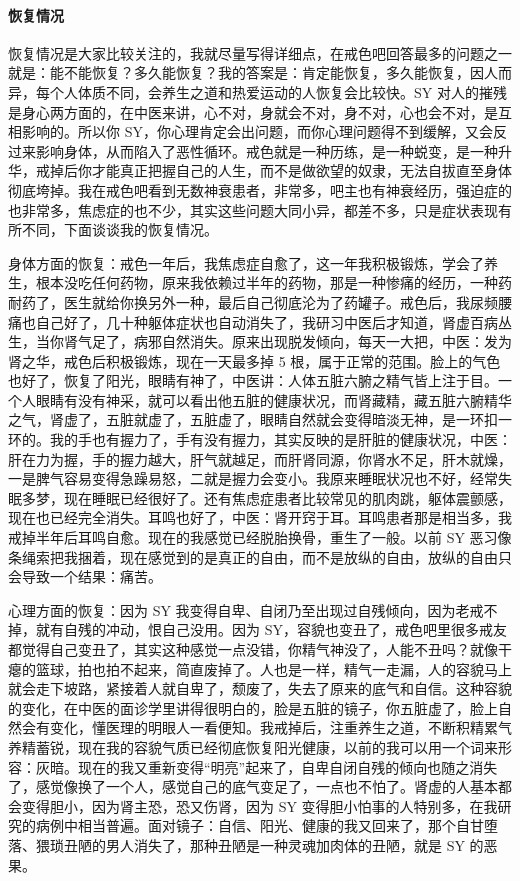 \documentclass[fontset=founder]{ctexart}
\begin{document}
\paragraph{恢复情况}

恢复情况是大家比较关注的，我就尽量写得详细点，在戒色吧回答最多的问题之一就是：能不能恢复？多久能恢复？我的答案是：肯定能恢复，多久能恢复，因人而异，每个人体质不同，会养生之道和热爱运动的人恢复会比较快。SY 对人的摧残是身心两方面的，在中医来讲，心不对，身就会不对，身不对，心也会不对，是互相影响的。所以你 SY，你心理肯定会出问题，而你心理问题得不到缓解，又会反过来影响身体，从而陷入了恶性循环。戒色就是一种历练，是一种蜕变，是一种升华，戒掉后你才能真正把握自己的人生，而不是做欲望的奴隶，无法自拔直至身体彻底垮掉。我在戒色吧看到无数神衰患者，非常多，吧主也有神衰经历，强迫症的也非常多，焦虑症的也不少，其实这些问题大同小异，都差不多，只是症状表现有所不同，下面谈谈我的恢复情况。

身体方面的恢复：戒色一年后，我焦虑症自愈了，这一年我积极锻炼，学会了养生，根本没吃任何药物，原来我依赖过半年的药物，那是一种惨痛的经历，一种药耐药了，医生就给你换另外一种，最后自己彻底沦为了药罐子。戒色后，我尿频腰痛也自己好了，几十种躯体症状也自动消失了，我研习中医后才知道，肾虚百病丛生，当你肾气足了，病邪自然消失。原来出现脱发倾向，每天一大把，中医：发为肾之华，戒色后积极锻炼，现在一天最多掉 5 根，属于正常的范围。脸上的气色也好了，恢复了阳光，眼睛有神了，中医讲：人体五脏六腑之精气皆上注于目。一个人眼睛有没有神采，就可以看出他五脏的健康状况，而肾藏精，藏五脏六腑精华之气，肾虚了，五脏就虚了，五脏虚了，眼睛自然就会变得暗淡无神，是一环扣一环的。我的手也有握力了，手有没有握力，其实反映的是肝脏的健康状况，中医：肝在力为握，手的握力越大，肝气就越足，而肝肾同源，你肾水不足，肝木就燥，一是脾气容易变得急躁易怒，二就是握力会变小。我原来睡眠状况也不好，经常失眠多梦，现在睡眠已经很好了。还有焦虑症患者比较常见的肌肉跳，躯体震颤感，现在也已经完全消失。耳鸣也好了，中医：肾开窍于耳。耳鸣患者那是相当多，我戒掉半年后耳鸣自愈。现在的我感觉已经脱胎换骨，重生了一般。以前 SY 恶习像条绳索把我捆着，现在感觉到的是真正的自由，而不是放纵的自由，放纵的自由只会导致一个结果：痛苦。

心理方面的恢复：因为 SY 我变得自卑、自闭乃至出现过自残倾向，因为老戒不掉，就有自残的冲动，恨自己没用。因为 SY，容貌也变丑了，戒色吧里很多戒友都觉得自己变丑了，其实这种感觉一点没错，你精气神没了，人能不丑吗？就像干瘪的篮球，拍也拍不起来，简直废掉了。人也是一样，精气一走漏，人的容貌马上就会走下坡路，紧接着人就自卑了，颓废了，失去了原来的底气和自信。这种容貌的变化，在中医的面诊学里讲得很明白的，脸是五脏的镜子，你五脏虚了，脸上自然会有变化，懂医理的明眼人一看便知。我戒掉后，注重养生之道，不断积精累气养精蓄锐，现在我的容貌气质已经彻底恢复阳光健康，以前的我可以用一个词来形容：灰暗。现在的我又重新变得“明亮”起来了，自卑自闭自残的倾向也随之消失了，感觉像换了一个人，感觉自己的底气变足了，一点也不怕了。肾虚的人基本都会变得胆小，因为肾主恐，恐又伤肾，因为 SY 变得胆小怕事的人特别多，在我研究的病例中相当普遍。面对镜子：自信、阳光、健康的我又回来了，那个自甘堕落、猥琐丑陋的男人消失了，那种丑陋是一种灵魂加肉体的丑陋，就是 SY 的恶果。
\end{document}
